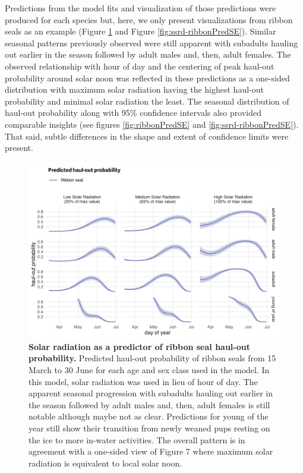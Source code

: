 \documentclass[fleqn,10pt,lineno]{wlpeerj} %
\begin{document}
Predictions from the model fits and visualization of those predictions were
produced for each species but, here, we only present visualizations from
ribbon seals as an example (Figure \ref{fig:ssrd-prediction-heatmap} and Figure
\ref{fig:ssrd-ribbonPredSE}). Similar seasonal patterns previously observed were
still apparent with subadults hauling out earlier in the season followed by
adult males and, then, adult females. The observed relationship with hour of
day and the centering of peak haul-out probability around solar noon was
reflected in these predictions as a one-sided distribution with maximum solar
radiation having the highest haul-out probability and minimal solar radiation
the least. The seasonal distribution of haul-out probability along with 95\%
confidence intervals also provided comparable insights (see figures
\ref{fig:ribbonPredSE} and \ref{fig:ssrd-ribbonPredSE}). That said, subtle
differences in the shape and extent of confidence limits were present.



\begin{figure}
\includegraphics[width=1\linewidth]{../figures/Figure-017} \caption{\textbf{Solar radiation as a predictor of ribbon seal haul-out probability.} \linebreak Predicted haul-out probability of ribbon seals from 15 March to 30 June for each age and sex class used in the model. In this model, solar radiation was used in lieu of hour of day. The apparent seasonal progression with subadults hauling out earlier in the season followed by adult males and, then, adult females is still notable although maybe not as clear. Predictions for young of the year still show their transition from newly weaned pups resting on the ice to more in-water activities. The overall pattern is in agreement with a one-sided view of Figure 7 where maximum solar radiation is equivalent to local solar noon.}\label{fig:ssrd-prediction-heatmap}
\end{figure}
\end{document}
